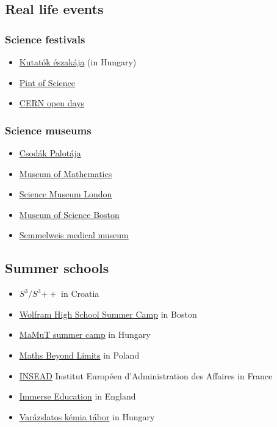 \documentclass{article}
\begin{document}
\subsection{Real life events}

\subsubsection{Science festivals}

\begin{itemize}
    \item \href{https://kutatokejszakaja.hu/}{Kutatók északája} (in Hungary)
    \item \href{https://pintofscience.com/}{Pint of Science}
    \item \href{https://opendays.cern/}{CERN open days}
\end{itemize}

\subsubsection{Science museums}

\begin{itemize}
    \item \href{https://www.csopa.hu/}{Csodák Palotája}
    \item \href{https://momath.org/}{Museum of Mathematics}
    \item \href{https://www.sciencemuseum.org.uk/home}{Science Museum London}
    \item \href{https://www.mos.org/}{Museum of Science Boston}
    
    \item \href{http://semmelweismuseum.hu/}{Semmelweis medical museum}
\end{itemize}

\subsection{Summer schools}

\begin{itemize}
    \item \href{http://drustvo-evo.hr/s3/}{$S^3/S^3{\mathrm{++}}$} in Croatia
    \item \href{https://education.wolfram.com/summer-camp/}{Wolfram High School Summer Camp} in Boston
    \item \href{https://en.agondolkodasorome.hu/summercamps/#}{MaMuT summer camp} in Hungary
    \item \href{https://mathsbeyondlimits.eu/}{Maths Beyond Limits} in Poland
    \item \href{https://www.insead.edu/summer-at-insead}{INSEAD} Institut Européen d'Administration des Affaires in France
    \item \href{https://www.immerse.education/}{Immerse Education} in England
    \item \href{https://www.varazslatos-kemia-tabor.mke.org.hu/}{Varázslatos kémia tábor} in Hungary
\end{itemize}
\end{document}
